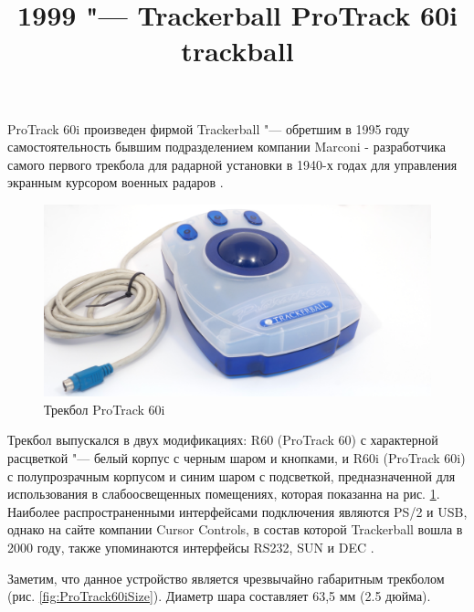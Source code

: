 \documentclass[11pt, a4paper]{article}
\begin{document}
\title{1999 "--- Trackerball ProTrack 60i trackball}
\date{}
\maketitle

ProTrack 60i произведен фирмой Trackerball "--- обретшим в 1995 году самостоятельность
бывшим подразделением компании Marconi - разработчика самого первого трекбола для радарной установки в 1940-х годах для управления экранным курсором военных радаров \cite{history}.

\begin{figure}[h]
    \centering
    \includegraphics[scale=0.3]{1999_protrack_60i/monstr1_30.jpg}
    \caption{Трекбол ProTrack 60i}
    \label{fig:ProTrack60i}
\end{figure}

Трекбол выпускался в двух модификациях: R60 (ProTrack 60) с характерной расцветкой "--- белый корпус с черным шаром и кнопками, и R60i (ProTrack 60i) с полупрозрачным корпусом и синим шаром с подсветкой, предназначенной для использования в слабоосвещенных помещениях, которая показанна на рис. \ref{fig:ProTrack60i}. Наиболее распространенными интерфейсами подключения являются PS/2 и USB, однако на сайте компании Cursor Controls, в состав которой Trackerball вошла в 2000 году,  также упоминаются интерфейсы RS232, SUN и DEC \cite{cursorcontrols}.

Заметим, что данное устройство является чрезвычайно габаритным трекболом (рис. \ref{fig:ProTrack60iSize}). Диаметр шара составляет 63,5 мм (2.5 дюйма).
\end{document}

